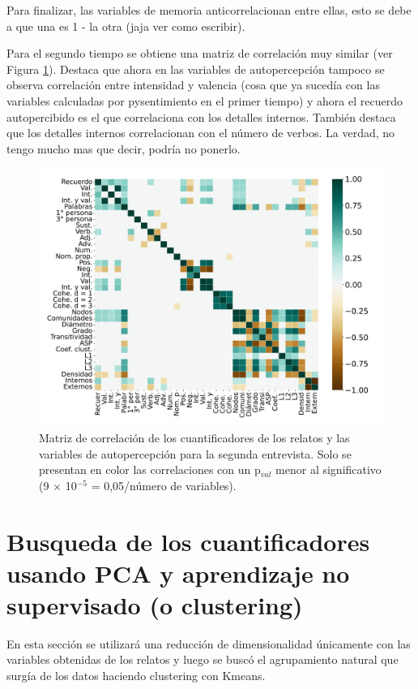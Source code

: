 Para finalizar, las variables de memoria anticorrelacionan entre ellas, esto se debe a que una es 1 - la otra (jaja ver como escribir).


Para el segundo tiempo se obtiene una matriz de correlación muy similar (ver Figura \ref{fig:cap3_corrsegt}). Destaca que ahora en las variables de autopercepción tampoco se observa correlación entre intensidad y valencia (cosa que ya sucedía con las variables calculadas por pysentimiento en el primer tiempo) y ahora el recuerdo autopercibido es el que correlaciona con los detalles internos. También destaca que los detalles internos correlacionan con el número de verbos. La verdad, no tengo mucho mas que decir, podría no ponerlo.



\begin{figure}[h]
    \centering
    \includegraphics[width = 15cm]{figures/ch03/Correlacion/2correlacion_Segunda.pdf} 
    \caption{Matriz de correlación de los cuantificadores de los relatos y las variables de autopercepción para la segunda entrevista. Solo se presentan en color las correlaciones con un p$_{val}$ menor al significativo (9 $\times$ 10$^{-5}$ = 0,05/número de variables).}
\label{fig:cap3_corrsegt}
\end{figure}

\section{Busqueda de los cuantificadores usando PCA y aprendizaje no supervisado (o clustering)}

En esta sección se utilizará una reducción de dimensionalidad únicamente con las variables obtenidas de los relatos y luego se buscó el agrupamiento natural que surgía de los datos haciendo clustering con Kmeans.

